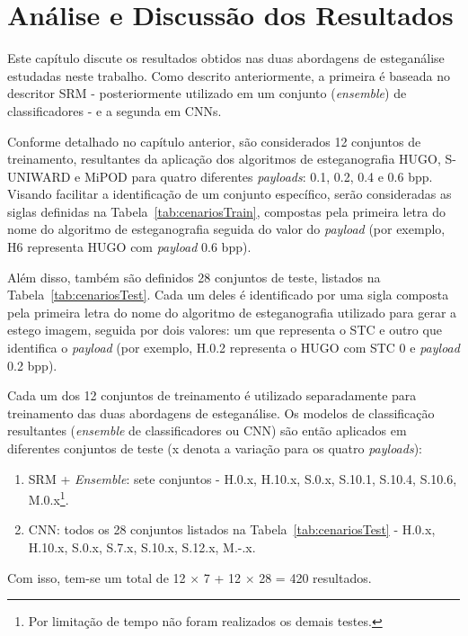
\chapter{Análise e Discussão dos Resultados}
\label{chap:resultados}

Este capítulo discute os resultados obtidos nas duas abordagens de esteganálise estudadas neste trabalho. Como descrito anteriormente, a primeira é baseada no descritor SRM - posteriormente utilizado em um conjunto (\textit{ensemble}) de classificadores - e a segunda em CNNs. 

Conforme detalhado no capítulo anterior, são considerados 12 conjuntos de treinamento, resultantes da aplicação dos algoritmos de esteganografia HUGO, S-UNIWARD e MiPOD para quatro diferentes \textit{payloads}: 0.1, 0.2, 0.4 e 0.6 bpp. Visando facilitar a identificação de um conjunto específico, serão consideradas as siglas definidas na Tabela~\ref{tab:cenariosTrain}, compostas pela primeira letra do nome do algoritmo de esteganografia seguida do valor do \textit{payload} (por exemplo, H6 representa HUGO com \textit{payload} 0.6 bpp).

Além disso, também são definidos 28 conjuntos de teste, listados na Tabela~\ref{tab:cenariosTest}. Cada um deles é identificado por uma sigla composta pela primeira letra do nome do algoritmo de esteganografia utilizado para gerar a estego imagem, seguida por dois valores: um  que representa o STC e outro que identifica o \textit{payload} (por exemplo, H.0.2 representa o HUGO com STC 0 e \textit{payload} 0.2 bpp).

Cada um dos 12 conjuntos de treinamento é utilizado separadamente para treinamento das duas abordagens de esteganálise. Os modelos de classificação resultantes (\textit{ensemble} de classificadores ou CNN) são então aplicados em diferentes conjuntos de teste (x denota a variação para os quatro \textit{payloads}):
\begin{enumerate}%
\item SRM + \textit{Ensemble}: sete conjuntos - H.0.x, H.10.x, S.0.x, S.10.1, S.10.4, S.10.6, M.0.x\footnote{Por limitação de tempo não foram realizados os demais testes.}.
\item CNN: todos os 28 conjuntos listados na Tabela~\ref{tab:cenariosTest} - H.0.x, H.10.x, S.0.x, S.7.x, S.10.x, S.12.x, M.-.x.
\end{enumerate}
Com isso, tem-se um total de 12 $\times$ 7 + 12 $\times$ 28 = 420 resultados.

